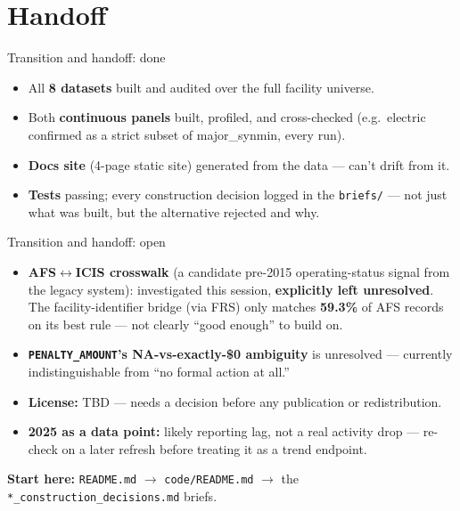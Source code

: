 \documentclass[aspectratio=169,11pt]{beamer}
\begin{document}
\section{Handoff}
\begin{frame}{Transition and handoff: done}
  \begin{itemize}
    \item All \textbf{8 datasets} built and audited over the full facility universe.
    \item Both \textbf{continuous panels} built, profiled, and cross-checked (e.g.\ electric confirmed as a
      strict subset of major\_synmin, every run).
    \item \textbf{Docs site} (4-page static site) generated from the data — can't drift from it.
    \item \textbf{Tests} passing; every construction decision logged in the \texttt{briefs/} — not just
      what was built, but the alternative rejected and why.
  \end{itemize}
\end{frame}

\begin{frame}{Transition and handoff: open}
  \begin{itemize}
    \item \textbf{AFS$\leftrightarrow$ICIS crosswalk} (a candidate pre-2015 operating-status signal from the
      legacy system): investigated this session, \textbf{explicitly left unresolved}. The
      facility-identifier bridge (via FRS) only matches \textbf{59.3\%} of AFS records on its best rule —
      not clearly ``good enough'' to build on.
    \item \textbf{\texttt{PENALTY\_AMOUNT}'s NA-vs-exactly-\$0 ambiguity} is unresolved — currently
      indistinguishable from ``no formal action at all.''
    \item \textbf{License:} TBD — needs a decision before any publication or redistribution.
    \item \textbf{2025 as a data point:} likely reporting lag, not a real activity drop — re-check on a
      later refresh before treating it as a trend endpoint.
  \end{itemize}
  \vspace{0.4em}
  \textbf{Start here:} \texttt{README.md} $\to$ \texttt{code/README.md} $\to$ the
  \texttt{*\_construction\_decisions.md} briefs.
\end{frame}

\end{document}
